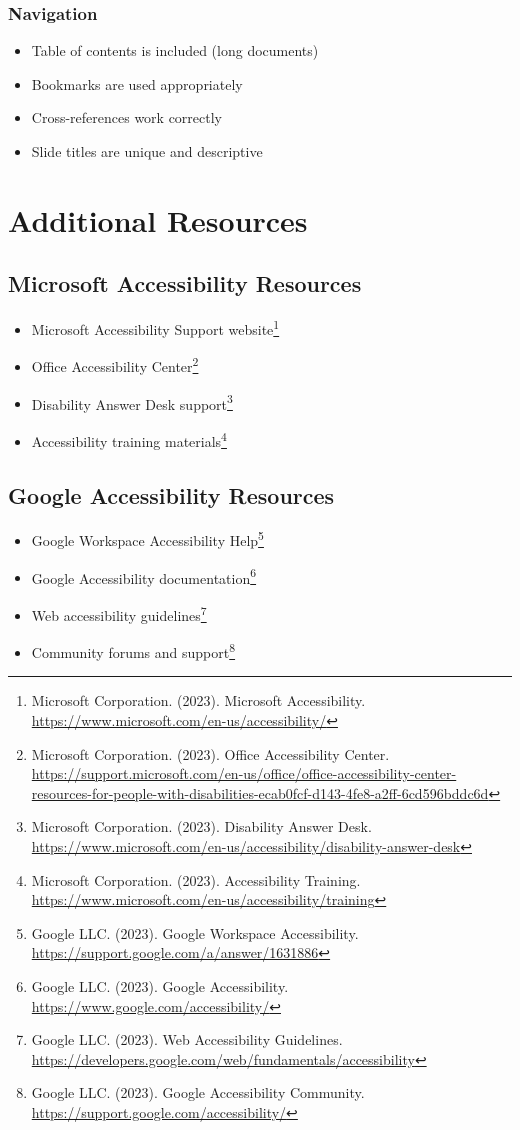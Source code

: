 \subsubsection{Navigation}
\begin{itemize}
\item[\checkmark] Table of contents is included (long documents)
\item[\checkmark] Bookmarks are used appropriately
\item[\checkmark] Cross-references work correctly
\item[\checkmark] Slide titles are unique and descriptive
\end{itemize}

\section{Additional Resources}
\label{sec:additional-resources}

\subsection{Microsoft Accessibility Resources}
\begin{itemize}
\item Microsoft Accessibility Support website\footnote{Microsoft Corporation. (2023). Microsoft Accessibility. \url{https://www.microsoft.com/en-us/accessibility/}}
\item Office Accessibility Center\footnote{Microsoft Corporation. (2023). Office Accessibility Center. \url{https://support.microsoft.com/en-us/office/office-accessibility-center-resources-for-people-with-disabilities-ecab0fcf-d143-4fe8-a2ff-6cd596bddc6d}}
\item Disability Answer Desk support\footnote{Microsoft Corporation. (2023). Disability Answer Desk. \url{https://www.microsoft.com/en-us/accessibility/disability-answer-desk}}
\item Accessibility training materials\footnote{Microsoft Corporation. (2023). Accessibility Training. \url{https://www.microsoft.com/en-us/accessibility/training}}
\end{itemize}

\subsection{Google Accessibility Resources}
\begin{itemize}
\item Google Workspace Accessibility Help\footnote{Google LLC. (2023). Google Workspace Accessibility. \url{https://support.google.com/a/answer/1631886}}
\item Google Accessibility documentation\footnote{Google LLC. (2023). Google Accessibility. \url{https://www.google.com/accessibility/}}
\item Web accessibility guidelines\footnote{Google LLC. (2023). Web Accessibility Guidelines. \url{https://developers.google.com/web/fundamentals/accessibility}}
\item Community forums and support\footnote{Google LLC. (2023). Google Accessibility Community. \url{https://support.google.com/accessibility/}}
\end{itemize}

